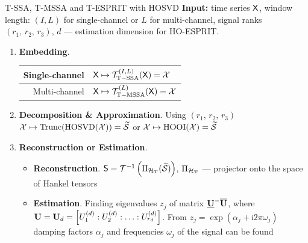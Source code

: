 \documentclass[pdf, unicode, ucs, notheorems]{beamer}
\theoremstyle{definition}
\begin{document}
\begin{frame}{T-SSA, T-MSSA and T-ESPRIT with HOSVD}
  \textbf{Input:} time series $\mathsf{X}$,
  window length: $(I, L)$ for single-channel or $L$ for multi-channel,
  signal ranks $(r_1,\, r_2,\, r_3)$, $d$ --- estimation dimension
  for HO-ESPRIT.
  \vspace{0.4cm}\\
  \begin{enumerate}
    \item \textbf{Embedding}.
      \begin{tabular}{r|l}
        Single-channel & $\mathsf{X} \mapsto\mathcal{T}_{\mathrm{T-SSA}}^{(I,
        L)}(\mathsf{X}) = \mathcal{X}$ \\ \hline
        Multi-channel &
        $\mathsf{X} \mapsto \mathcal{T}_{\mathrm{T-MSSA}}^{(L)}(\mathsf{X}) = \mathcal{X}$
      \end{tabular}
      \vspace{0.2cm}

    \item \textbf{Decomposition \& Approximation}. Using $(r_1,\,
      r_2,\, r_3)$\\\smallskip
      $\mathcal{X} \mapsto
      \operatorname{Trunc}(\operatorname{HOSVD}(\mathcal{X})) =
      \widetilde{\mathcal{S}}$ or
      $\mathcal{X} \mapsto \operatorname{HOOI}(\mathcal{X}) = \widetilde{\mathcal{S}}$
      \vspace{0.2cm}

    \item \textbf{Reconstruction or Estimation}. \\
      \begin{itemize}
        \item \textbf{Reconstruction}.
          $\mathsf{S} = \mathcal{T}^{-1}
          \left(\Pi_{\mathcal{H}_{\mathrm{T}}} (\widetilde{\mathcal{S}})\right)$,
          $\Pi_{\mathcal{H}_{\mathrm{T}}}$ --- projector onto the space of
          Hankel tensors
        \item \textbf{Estimation}. Finding eigenvalues $z_j$ of
          matrix $\underline{\mathbf{U}}^{-}\overline{\mathbf{U}}$, where
          $\mathbf{U} = \mathbf{U}_d = \left[U_1^{(d)}:U_2^{(d)}:\ldots
          :U_{r_d}^{(d)}\right]$.
          From $z_j = \exp(\alpha_j + \mathrm{i}2\pi\omega_j)$
          damping factors $\alpha_j$ and frequencies $\omega_j$ of
          the signal can be found
      \end{itemize}
  \end{enumerate}
\end{frame}
\end{document}
